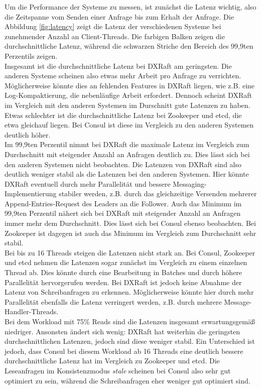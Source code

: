 Um die Performance der Systeme zu messen, ist zunächst die Latenz wichtig, also die Zeitspanne vom Senden einer Anfrage bis zum Erhalt der Anfrage. Die Abbildung \ref{fig:latency} zeigt die Latenz der verschiedenen Systeme bei zunehmender Anzahl an Client-Threads. Die farbigen Balken zeigen die durchschnittliche Latenz, während die schwarzen Striche den Bereich des 99,9ten Perzentils zeigen. \\
Insgesamt ist die durchschnittliche Latenz bei DXRaft am geringsten. Die anderen Systeme scheinen also etwas mehr Arbeit pro Anfrage zu verrichten. Möglicherweise könnte dies an fehlenden Features in DXRaft liegen, wie z.B. eine Log-Kompaktierung, die nebenläufige Arbeit erfordert. Dennoch scheint DXRaft im Vergleich mit den anderen Systemen im Durschnitt gute Latenzen zu haben. Etwas schlechter ist die durchschnittliche Latenz bei Zookeeper und etcd, die etwa gleichauf liegen. Bei Consul ist diese im Vergleich zu den anderen Systemen deutlich höher.\\
Im 99,9ten Perzentil nimmt bei DXRaft die maximale Latenz im Vergleich zum Durchschnitt mit steigender Anzahl an Anfragen deutlich zu. Dies lässt sich bei den anderen Systemen nicht beobachten. Die Latenzen von DXRaft sind also deutlich weniger stabil als die Latenzen bei den anderen Systemen. Hier könnte DXRaft eventuell durch mehr Parallelität und bessere Messaging-Implementierung stabiler werden, z.B. durch das gleichzeitige Versenden mehrerer Append-Entries-Request des Leaders an die Follower. Auch das Minimum im 99,9ten Perzentil nähert sich bei DXRaft mit steigender Anzahl an Anfragen immer mehr dem Durchschnitt. Dies lässt sich bei Consul ebenso beobachten. Bei Zookeeper ist dagegen ist auch das Minimum im Vergleich zum Durchschnitt sehr stabil.\\
Bei bis zu 16 Threads steigen die Latenzen nicht stark an. Bei Consul, Zookeeper und etcd nehmen die Latenzen sogar zunächst im Vergleich zu einem einzelnen Thread ab. Dies könnte durch eine Bearbeitung in Batches und durch höhere Parallelität hervorgerufen werden. Bei DXRaft ist jedoch keine Abnahme der Latenz von Schreibanfragen zu erkennen. Möglicherweise könnte hier durch mehr Parallelität ebenfalls die Latenz verringert werden, z.B. durch mehrere Message-Handler-Threads.\\
Bei dem Workload mit 75\% Reads sind die Latenzen insgesamt erwartungsgemäß niedriger. Ansonsten ändert sich wenig: DXRaft hat weiterhin die geringsten durchschnittlichen Latenzen, jedoch sind diese weniger stabil. Ein Unterschied ist jedoch, dass Consul bei diesem Workload ab 16 Threads eine deutlich bessere durchschnittliche Latenz hat im Vergleich zu Zookeeper und etcd. Die Leseanfragen im Konsistenzmodus \textit{stale} scheinen bei Consul also sehr gut optimiert zu sein, während die Schreibanfragen eher weniger gut optimiert sind.

